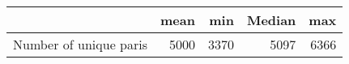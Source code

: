 \begin{tabular}{lrrrr}
\toprule
{} &  mean &   min &  Median &   max \\
\midrule
Number of unique paris &  5000 &  3370 &    5097 &  6366 \\
\bottomrule
\end{tabular}
